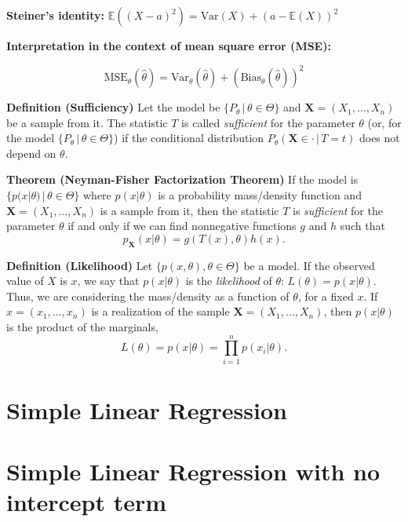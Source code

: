 \documentclass[12pt,a4paper,oneside]{book} %
\begin{document}
\textbf{Steiner's identity:} $\mathbb{E}((X - a)^2) = \text{Var}(X) + (a - \mathbb{E}(X))^2$

\textbf{Interpretation in the context of mean square error (MSE):}

\[ \text{MSE}_{\theta}(\hat{\theta}) = \text{Var}_{\theta}(\hat{\theta}) + (\text{Bias}_{\theta}(\hat{\theta}))^2 \]

\textbf{Definition (Sufficiency)} Let the model be $\{P_{\theta} \,|\, \theta \in \Theta\}$ and $\mathbf{X} = (X_1, \ldots, X_n)$ be a sample from it. The statistic $T$ is called \textit{sufficient} for the parameter $\theta$ (or, for the model $\{P_{\theta} \,|\, \theta \in \Theta\}$) if the conditional distribution $P_{\theta}(\mathbf{X} \in \cdot \,|\, T = t)$ does not depend on $\theta$.

\textbf{Theorem (Neyman-Fisher Factorization Theorem)} If the model is $\{p(x|\theta) \,|\, \theta \in \Theta\}$ where $p(x|\theta)$ is a probability mass/density function and $\mathbf{X} = (X_1, \ldots, X_n)$ is a sample from it, then the statistic $T$ is \textit{sufficient} for the parameter $\theta$ if and only if we can find nonnegative functions $g$ and $h$ such that
\[ p_{\mathbf{X}}(x | \theta) = g(T(x), \theta)h(x). \]

\textbf{Definition (Likelihood)} Let $\{p(x, \theta), \theta \in \Theta\}$ be a model. If the observed value of $X$ is $x$, we say that $p(x | \theta)$ is the \textit{likelihood} of $\theta$: $L(\theta) = p(x | \theta)$. Thus, we are considering the mass/density as a function of $\theta$, for a fixed $x$. If $x = (x_1, \ldots, x_n)$ is a realization of the sample $\mathbf{X} = (X_1, \ldots, X_n)$, then $p(x | \theta)$ is the product of the marginals,
\[ L(\theta) = p(x | \theta) = \prod_{i=1}^{n} p(x_i | \theta). \]




	\clearpage
	
	\section{Simple Linear Regression}

	\clearpage

	\section{Simple Linear Regression with no intercept term}
	
\end{document}
